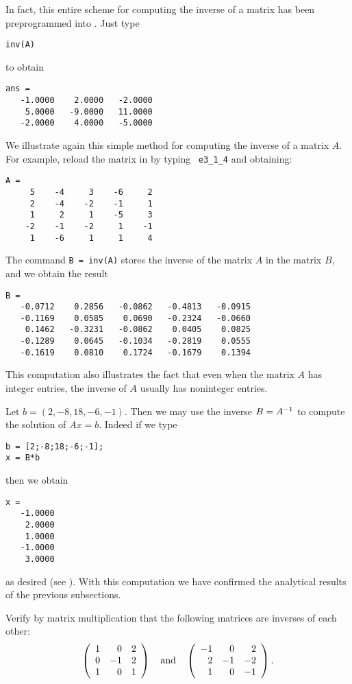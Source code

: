 \documentclass{ximera}
\begin{document}
In fact, this entire scheme for computing the inverse of a
matrix has been preprogrammed into \Matlab.  Just type
\begin{verbatim}
inv(A)
\end{verbatim} 
to obtain
\begin{verbatim}
ans =
   -1.0000    2.0000   -2.0000
    5.0000   -9.0000   11.0000
   -2.0000    4.0000   -5.0000
\end{verbatim}

We illustrate again this simple method for computing the inverse
of a matrix $A$.  For example, reload the matrix in 
by typing \verb+ e3_1_4+ and obtaining:
\begin{verbatim}
A =
     5    -4     3    -6     2
     2    -4    -2    -1     1
     1     2     1    -5     3
    -2    -1    -2     1    -1
     1    -6     1     1     4
\end{verbatim}
The command {\tt B = inv(A)} stores the inverse of the matrix $A$
in the matrix $B$, and we obtain the result
\begin{verbatim}
B =
   -0.0712    0.2856   -0.0862   -0.4813   -0.0915
   -0.1169    0.0585    0.0690   -0.2324   -0.0660
    0.1462   -0.3231   -0.0862    0.0405    0.0825
   -0.1289    0.0645   -0.1034   -0.2819    0.0555
   -0.1619    0.0810    0.1724   -0.1679    0.1394
\end{verbatim}
This computation also illustrates the fact that even when the matrix
$A$ has integer entries, the inverse of $A$ usually has noninteger
entries.

Let $b=(2,-8,18,-6,-1)$.  Then we may use the inverse $B=A^{-1}$
to compute the solution of $Ax=b$.  Indeed if we type
\begin{verbatim}
b = [2;-8;18;-6;-1];
x = B*b
\end{verbatim}
then we obtain
\begin{verbatim}
x =
   -1.0000
    2.0000
    1.0000
   -1.0000
    3.0000
\end{verbatim}
as desired (see ).  With this computation we have confirmed
the analytical results of the previous subsections.





\EXER

\TEXER

\begin{exercise} \label{c4.8.1}
Verify by matrix multiplication that the following matrices are inverses
of each other:
\[
\left( \begin{array}{rrr}
1  &  0  &  2\\
0  & -1  &  2\\
1  &  0  &  1
\end{array} \right)\quad\mbox{and}\quad
\left( \begin{array}{rrr}
-1 &   0 &   2\\
 2 &  -1 &  -2\\
 1 &   0 &  -1
\end{array} \right).
\]
\end{exercise}
\end{document}
